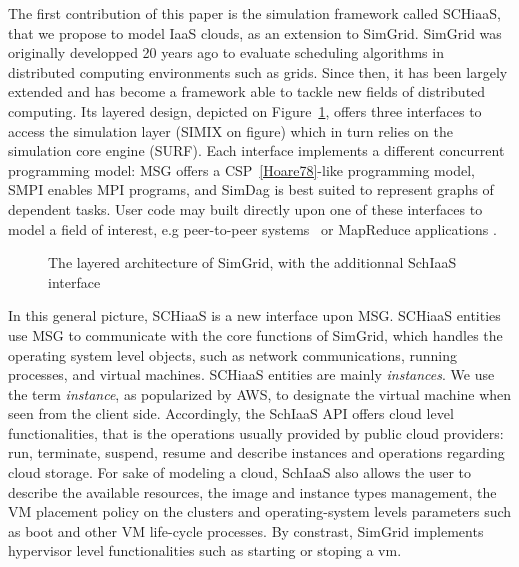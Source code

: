 The first contribution of this paper is the simulation framework called SCHiaaS,
that we propose  to model IaaS clouds,  as an extension to  SimGrid. SimGrid was
originally  developped  20  years  ago  to  evaluate  scheduling  algorithms  in
distributed  computing environments  such as  grids.   Since then,  it has  been
largely  extended and  has  become a  framework  able to  tackle  new fields  of
distributed     computing.      Its      layered     design,     depicted     on
Figure~\ref{fg:sg-archi}, offers three interfaces to access the simulation layer
(SIMIX on  figure) which in  turn relies on  the simulation core  engine (SURF).
Each interface implements a different concurrent programming model: MSG offers a
CSP~\ref{Hoare78}-like programming model, SMPI  enables MPI programs, and SimDag
is best  suited to  represent graphs  of dependent tasks.   User code  may built
directly  upon  one of  these  interfaces  to model  a  field  of interest,  e.g
peer-to-peer     systems~\cite{QuinsonRT12}     or    MapReduce     applications
\cite{KolbergMAMGA13}.
\begin{figure}[hbt]

\caption{The  layered  architecture of  SimGrid,  with  the additionnal  SchIaaS
  interface}
\label{fg:sg-archi}
\end{figure}
%
In this general  picture, SCHiaaS is a new interface  upon MSG. SCHiaaS entities
use MSG  to communicate with  the core functions  of SimGrid, which  handles the
operating  system  level  objects,   such  as  network  communications,  running
processes, and  virtual machines. SCHiaaS entities  are mainly \emph{instances}.
We use the term \emph{instance}, as popularized by AWS, to designate the virtual
machine when  seen from  the client  side. Accordingly,  the SchIaaS  API offers
cloud level functionalities,  that is the operations usually  provided by public
cloud  providers: run,  terminate, suspend,  resume and  describe instances  and
operations regarding cloud  storage. For sake of modeling a  cloud, SchIaaS also
allows the  user to  describe the  available resources,  the image  and instance
types management, the  VM placement policy on the  clusters and operating-system
levels parameters such as boot and other VM life-cycle processes.  By constrast,
SimGrid implements hypervisor level functionalities  such as starting or stoping
a \ac{vm}.








